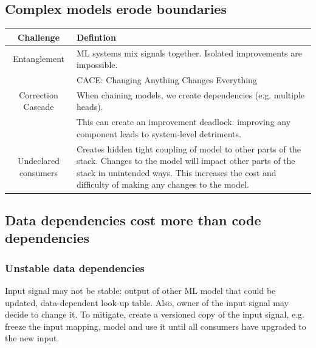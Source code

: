 \documentclass[../main.tex]{subfiles}
\begin{document}
\subsection{Complex models erode boundaries}
\begin{center}
    \begin{tabular}{ |c|p{10cm}|}
        \hline
        Challenge & Defintion \\
        \hline
        \hline
        Entanglement & ML systems mix signals together. Isolated improvements are impossible. \\
                     & CACE: Changing Anything Changes Everything \\
        \hline
        Correction Cascade & When chaining models, we create dependencies (e.g. multiple heads). \\
                           & This can create an improvement deadlock: improving any component leads to
                           system-level detriments. \\
        \hline
        Undeclared consumers & Creates hidden tight coupling of model to other parts of the stack.
            Changes to the model will impact other parts of the stack in unintended ways.
            This increases the cost and difficulty of making any changes to the model. \\
        \hline
    \end{tabular}
\end{center}

\subsection{Data dependencies cost more than code dependencies}

\subsubsection{Unstable data dependencies}
 Input signal may not be stable: output of other ML model that could
be updated, data-dependent look-up table. Also, owner of the input signal may decide to change
it. To mitigate, create a versioned copy of the input signal, e.g. freeze the input mapping, model
and use it until all consumers have upgraded to the new input. \\
\end{document}
